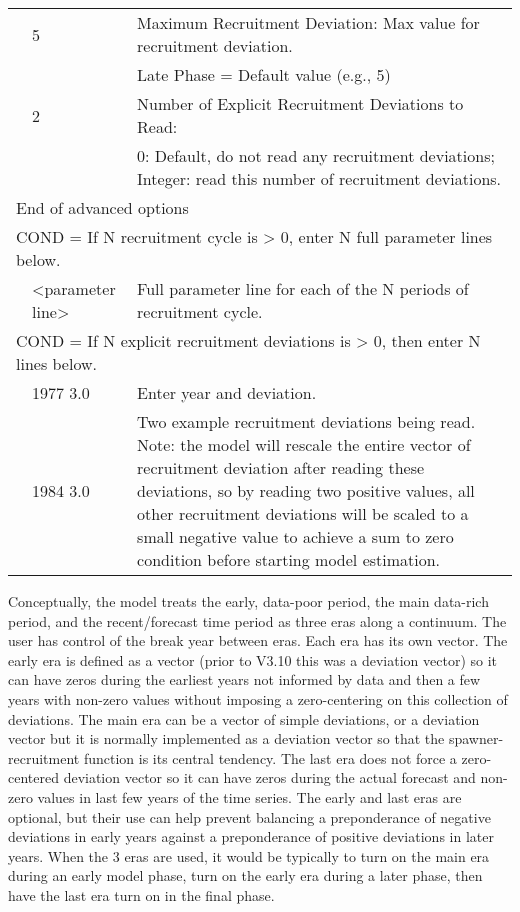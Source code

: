 \begin{longtable}{p{1cm} p{3cm} p{11cm}}
	\Tstrut & 5    & Maximum Recruitment Deviation: Max value for recruitment deviation. \\
			&      & Late Phase = Default value (e.g., 5)\\
	
	\Tstrut & 2    & Number of Explicit Recruitment Deviations to Read:\\
			&      & 0: Default, do not read any recruitment deviations; Integer: read this number of recruitment deviations.\\
	
	\multicolumn{3}{l}{End of advanced options}\Tstrut\Bstrut\\
	\hline

	\multicolumn{3}{l}{COND = If N recruitment cycle is > 0, enter N full parameter lines below.}\Tstrut\\
	\Tstrut & <parameter line> & Full parameter line for each of the N periods of recruitment cycle.\Bstrut\\
	\hline

	\multicolumn{3}{l}{COND = If N explicit recruitment deviations is > 0, then enter N lines below.}\Tstrut\Bstrut\\
	& 1977 3.0 & Enter year and deviation.\\
	& 1984 3.0 & Two example recruitment deviations being read.  Note: the model will rescale the entire vector of recruitment deviation after reading these deviations, so by reading two positive values, all other recruitment deviations will be scaled to a small negative value to achieve a sum to zero condition before starting model estimation.\Bstrut\\
	\hline
\end{longtable}

Conceptually, the model treats the early, data-poor period, the main data-rich period, and the recent/forecast time period as three eras along a continuum. The user has control of the break year between eras.  Each era has its own vector. The early era is defined as a vector (prior to V3.10 this was a deviation vector) so it can have zeros during the earliest years not informed by data and then a few years with non-zero values without imposing a zero-centering on this collection of deviations. The main era can be a vector of simple deviations, or a deviation vector but it is normally implemented as a deviation vector so that the spawner-recruitment function is its central tendency. The last era does not force a zero-centered deviation vector so it can have zeros during the actual forecast and non-zero values in last few years of the time series. The early and last eras are optional, but their use can help prevent balancing a preponderance of negative deviations in early years against a preponderance of positive deviations in later years. When the 3 eras are used, it would be typically to turn on the main era during an early model phase, turn on the early era during a later phase, then have the last era turn on in the final phase.

